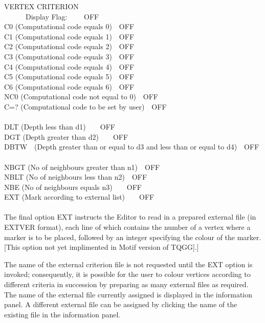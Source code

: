 \documentclass{article}
\begin{document}
VERTEX CRITERION \\
\ \ \ \ \ \ Display Flag: \ \ \ \ OFF
\\
C0 (Computational code equals 0)\ \ OFF\\
C1 (Computational code equals 1)\ \ OFF\\
C2 (Computational code equals 2)\ \ OFF\\
C3 (Computational code equals 3)\ \ OFF\\
C4 (Computational code equals 4)\ \ OFF\\
C5 (Computational code equals 5)\ \ OFF\\
C6 (Computational code equals 6)\ \ OFF\\
NC0 (Computational code not equal to 0)\ \ OFF\\
C=? (Computational code to be set by user)\ \ OFF\\
\\
DLT (Depth less than d1)\ \ \ \ OFF\\
DGT (Depth greater than d2)\ \ \ \ OFF\\
DBTW\ \ (Depth greater than or equal to d3 and less than or equal to d4)\ \ OFF\\
\\
NBGT (No of neighbours greater than n1)\ \ OFF\\
NBLT (No of neighbours less than n2)\ \ OFF\\
NBE (No of neighbours equals n3)\ \ \ \ OFF\\
EXT (Mark according to external list)\ \ \ \ OFF
\\ \\



The final option EXT instructs the Editor to read in a prepared external file (in EXTVER format), each line of which contains the number of a vertex where a marker is to be placed, followed by an integer specifying the colour of the marker. [This option not yet implimented in Motif version of TQGG].]

The name of the external criterion file is not requested until the EXT option is invoked; consequently, it is possible for the user to colour vertices according to different criteria in succession by preparing as many external files as required. The name of the external file currently assigned is displayed in the information panel. A different external file can be assigned by clicking the name of the existing file in the information panel.
\end{document}
